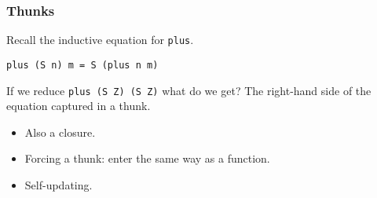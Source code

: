 \documentclass{beamer}
\begin{document}
\begin{frame}[fragile]
    \frametitle{Thunks}

    Recall the inductive equation for \texttt{plus}.
    \begin{lstlisting}
plus (S n) m = S (plus n m)
    \end{lstlisting}
    If we reduce \texttt{plus (S Z) (S Z)} what do we get? The right-hand side
    of the equation captured in a \alert{thunk}.

    \begin{itemize}
        \item Also a closure.
        \item \alert{Forcing} a thunk: enter the same way as a function.
        \item Self-updating.
    \end{itemize}
\end{frame}

\newcommand{\makeboxes}[2]{
    \def\name{#1}
    \def\num{#2}
    \pgfmathsetmacro{\ylim}{0.5}
    \pgfmathsetmacro{\xsep}{1}

    \pgfmathsetmacro{\xnum}{\num - 1}
    \foreach \y in {0, \ylim} {
        \foreach \x in {0,...,\xnum}{
            \draw (\x * \xsep, \y) -- (\x * \xsep + \xsep, \y);
        }
    }

    \foreach \x in {0,...,\num} {
        \draw (\x * \xsep, 0) -- (\x * \xsep, \ylim);
        \pgfmathsetmacro{\xpos}{\x * \xsep + \xsep * 0.5}
        \pgfmathsetmacro{\ypos}{\ylim * 0.5}
        \node (\name-box-\x) at (\xpos, \ypos) {};
    }
}
\end{document}

